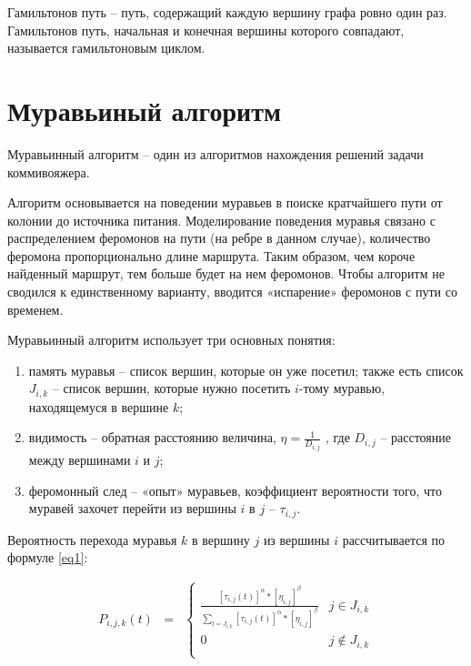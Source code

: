\documentclass[12pt]{report}
\begin{document}
Гамильтонов путь – путь, содержащий каждую вершину графа ровно один раз. Гамильтонов путь, начальная и конечная вершины которого совпадают, называется гамильтоновым циклом.

\section{Муравьиный алгоритм}

Муравьинный алгоритм – один из алгоритмов нахождения решений задачи коммивояжера. 

Алгоритм основывается на поведении муравьев в поиске кратчайшего пути от колонии до источника питания. Моделирование поведения муравья связано с распределением феромонов на пути (на ребре в данном случае), количество феромона пропорционально длине маршрута. Таким образом, чем короче найденный маршрут, тем больше будет на нем феромонов. Чтобы алгоритм не сводился к единственному варианту, вводится «испарение» феромонов с пути со временем.


Муравьинный алгоритм использует три основных понятия:

\begin{enumerate}
	
	\item память муравья – список вершин, которые он уже посетил; также есть список $J_{i,k}$ – список вершин, которые нужно посетить $i$-тому муравью, находящемуся в вершине $k$;
	
	\item видимость – обратная расстоянию величина, $\eta = \frac{1}{D_{i,j}}$ , где $D_{i,j}$ – расстояние между вершинами $i$ и $j$;
	
	\item феромонный след – «опыт» муравьев, коэффициент вероятности того, что муравей захочет перейти из вершины $i$ в $j$ – $\tau_{i,j}$.
	
\end{enumerate}


Вероятность перехода муравья $k$ в вершину $j$ из вершины $i$ рассчитывается по формуле \ref{eq1}:

\begin{equation}
	\label{eq1} 
	\begin{matrix}
		P_{i,j,k}(t) & = 
		& \left\{
		\begin{matrix}
			\frac{[\tau_{i,j}(t)]^\alpha * [\eta_{i,j}]^\beta}{\sum\limits_{l = J_{i,k}} [\tau_{i,j}(t)]^\alpha * [\eta_{i,j}]^\beta }   & j \in J_{i,k} \\
			0 & j \notin J_{i,k} \\
		\end{matrix} \right. 
	\end{matrix}
\end{equation}
\end{document}

